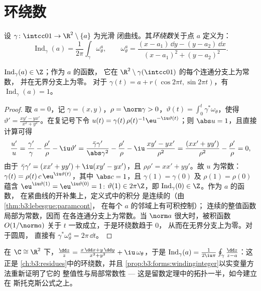 \section{环绕数}\label{sec:b3:forms:winding}

\begin{definition}\label{def:b3:forms:winding}
设 $\gamma\colon\intcc01\to\R^2\setminus\{a\}$ 为光滑
闭曲线。其\emph{环绕数}关于点 $a$ 定义为：
\[
\operatorname{Ind}_\gamma(a) =
\frac1{2\pi}\int_\gamma\omega_\theta^a,
\qquad
\omega_\theta^a = \frac{(x - a_1)\,\dd y - (y - a_2)\,\dd
x}{(x - a_1)^2 + (y - a_2)^2} .
\]
\end{definition}

\begin{proposition}\label{prop:b3:forms:windinginteger}
$\operatorname{Ind}_\gamma(a) \in \Z$；作为 $a$ 的函数，
它在 $\R^2\setminus\gamma(\intcc01)$ 的每个连通分支上为常数，
并在无界分支上为零。
对于 $\gamma(t) = a + r(\cos2\pi t, \sin2\pi t)$，有
$\operatorname{Ind}_\gamma(a) = 1$。
\end{proposition}

\begin{proof}
取 $a = 0$，记 $\gamma = (x, y)$，$\rho =
\norm\gamma > 0$，$\vartheta(t) =
\int_0^t\gamma^*\omega_\theta$，使得 $\vartheta' =
\frac{xy' - yx'}{x^2 + y^2}$。在复记号下令 $u(t)
= \gamma(t)\,\rho(t)^{-1}\eu^{-\iu\vartheta(t)}$；则
$\abs u = 1$，且直接计算可得
\[
\frac{u'}{u} = \frac{\gamma'}{\gamma} - \frac{\rho'}{\rho}
- \iu\vartheta'
= \frac{\bar\gamma\gamma'}{\abs\gamma^2} -
\frac{\rho'}{\rho} - \iu\,\frac{xy' -
yx'}{\rho^2}
= \frac{(xx' + yy')}{\rho^2} - \frac{\rho'}{\rho} = 0,
\]
由于 $\bar\gamma\gamma' = (xx' + yy') + \iu(xy' - yx')$，且
$\rho\rho' = xx' + yy'$。故 $u$ 为常数：$\gamma(t) =
\rho(t)\,c\,\eu^{\iu\vartheta(t)}$，其中 $\abs c = 1$，且
$\gamma(1) = \gamma(0)$ 及 $\rho(1) = \rho(0)$ 蕴含
$\eu^{\iu\vartheta(1)} = \eu^{\iu\vartheta(0)} = 1$:
$\vartheta(1) \in 2\pi\Z$，即
$\operatorname{Ind}_\gamma(0) \in \Z$。作为 $a$ 的函数，
在紧曲线的开补集上，定义式中的积分
是连续的（由\cref{thm:b3:lebesgue:paramcont}，
在每个 $a$ 的邻域上有可积控制）；
连续的整值函数局部为常数，因而
在各连通分支上为常数。当 $\norm a$ 很大时，被积函数
$O(1/\norm a)$ 关于 $t$ 一致成立，于是环绕数趋于 $0$，
从而在无界分支上为零。对于圆周，
直接有 $\gamma^*\omega_\theta^a = 2\pi\,\dd t$。
\end{proof}

\begin{remark}
在 $\C \cong \R^2$ 下，$\frac{\dd z}{z} = \frac{x\,\dd x +
y\,\dd y}{x^2 + y^2} + \iu\,\omega_\theta$，于是
$\operatorname{Ind}_\gamma(a) =
\frac1{2\iu\pi}\oint_\gamma\frac{\dd z}{z - a}$：这正是
\cref{ch:b3:residues}中的环绕数，并且
\cref{prop:b3:forms:windinginteger}以实变量方法重新证明了它的
整值性与局部常数性 ---
这是留数定理中的拓扑一半，如今建立在
斯托克斯公式之上。
\end{remark}

